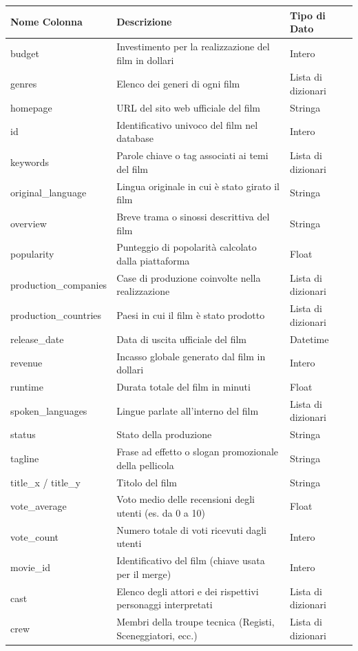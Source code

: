\documentclass{article}
\begin{document}
\begin{table}[H]
	\centering
	\renewcommand{\arraystretch}{1.4} 
	\begin{tabularx}{\textwidth}{@{} l X l @{}}
		\toprule
		\textbf{Nome Colonna} & \textbf{Descrizione} & \textbf{Tipo di Dato} \\
		\midrule
		
		budget                & Investimento per la realizzazione del film in dollari & Intero \\
		genres                & Elenco dei generi di ogni film & Lista di dizionari \\
		homepage              & URL del sito web ufficiale del film & Stringa \\
		id                    & Identificativo univoco del film nel database & Intero \\
		keywords              & Parole chiave o tag associati ai temi del film & Lista di dizionari \\
		original\_language    & Lingua originale in cui \`e stato girato il film & Stringa \\
		overview              & Breve trama o sinossi descrittiva del film & Stringa \\
		popularity            & Punteggio di popolarità calcolato dalla piattaforma & Float \\
		production\_companies & Case di produzione coinvolte nella realizzazione & Lista di dizionari \\
		production\_countries & Paesi in cui il film \`e stato prodotto & Lista di dizionari \\
		release\_date         & Data di uscita ufficiale del film & Datetime \\
		revenue               & Incasso globale generato dal film in dollari & Intero \\
		runtime               & Durata totale del film in minuti & Float \\
		spoken\_languages     & Lingue parlate all'interno del film & Lista di dizionari \\
		status                & Stato della produzione & Stringa \\
		tagline               & Frase ad effetto o slogan promozionale della pellicola & Stringa \\
		title\_x / title\_y   & Titolo del film & Stringa \\
		vote\_average         & Voto medio delle recensioni degli utenti (es. da 0 a 10) & Float \\
		vote\_count           & Numero totale di voti ricevuti dagli utenti & Intero \\
		movie\_id             & Identificativo del film (chiave usata per il merge) & Intero \\
		cast                  & Elenco degli attori e dei rispettivi personaggi interpretati & Lista di dizionari \\
		crew                  & Membri della troupe tecnica (Registi, Sceneggiatori, ecc.) & Lista di dizionari \\
		
		\bottomrule
	\end{tabularx}
\end{table}
\end{document}
